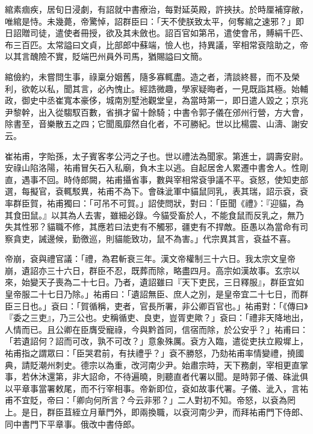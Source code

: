 \begin{pinyinscope}
 綰素痼疾，居旬日浸劇，有詔就中書療治，每對延英殿，許挾扶。於時厘補穿敝，唯綰是恃。未幾薨，帝驚悼，詔群臣曰：「天不使朕致太平，何奪綰之速邪？」即日詔贈司徒，遣使者冊授，欲及其未斂也。詔百官如第吊，遣使會吊，賻絹千匹、布三百匹。太常謚曰文貞，比部郎中蘇端，憸人也，持異議，宰相常袞陰助之，帝以其言醜險不實，貶端巴州員外司馬，猶賜謚曰文簡。



 綰儉約，未嘗問生事，祿稟分姻舊，隨多寡輒盡。造之者，清談終晷，而不及榮利，欲乾以私，聞其言，必內愧止。經誥微趣，學家疑晦者，一見既詣其極。始輔政，御史中丞崔寬本豪侈，城南別墅池觀堂皇，為當時第一，即日遣人毀之；京兆尹黎幹，出入從騶馭百數，省損才留十餘騎；中書令郭子儀在邠州行營，方大會，除書至，音樂散五之四；它聞風靡然自化者，不可勝紀。世以比楊震、山濤、謝安云。



 崔祐甫，字貽孫，太子賓客孝公沔之子也。世以禮法為聞家。第進士，調壽安尉。安祿山陷洛陽，祐甫冒矢石入私廟，負木主以逃。自起居舍人累遷中書舍人。性剛直，遇事不回。時侍郎闕，祐甫攝省事，數與宰相常袞爭議不平。袞怒，使知吏部選，每擬官，袞輒駁異，祐甫不為下。會硃泚軍中貓鼠同乳，表其瑞，詔示袞，袞率群臣賀，祐甫獨曰：「可吊不可賀。」詔使問狀，對曰：「臣聞《禮》：『迎貓，為其食田鼠。』以其為人去害，雖細必錄。今貓受畜於人，不能食鼠而反乳之，無乃失其性邪？貓職不修，其應若曰法吏有不觸邪，疆吏有不捍敵。臣愚以為當命有司察貪吏，誡邊候，勤徼巡，則貓能致功，鼠不為害。」代宗異其言，袞益不喜。



 帝崩，袞與禮官議：「禮，為君斬衰三年。漢文帝權制三十六日。我太宗文皇帝崩，遺詔亦三十六日，群臣不忍，既葬而除，略盡四月。高宗如漢故事。玄宗以來，始變天子喪為二十七日。乃者，遺詔雖曰『天下吏民，三日釋服』，群臣宜如皇帝服二十七日乃除。」祐甫曰：「遺詔無臣、庶人之別，是皇帝宜二十七日，而群臣三日也。」袞曰：「賀循稱，吏者，官長所署，非公卿百官也。」祐甫對：「《傳曰》『委之三吏』，乃三公也。史稱循吏、良吏，豈胥吏歟？」袞曰：「禮非天降地出，人情而已。且公卿在臣膺受寵祿，今與黔首同，信宿而除，於公安乎？」祐甫曰：「若遺詔何？詔而可改，孰不可改？」意象殊厲。袞方入臨，遣從吏扶立殿墀上，祐甫指之謂眾曰：「臣哭君前，有扶禮乎？」袞不勝怒，乃劾祐甫率情變禮，撓國典，請貶潮州刺史。德宗以為重，改河南少尹。始肅宗時，天下務劇，宰相更直掌事，若休沐還第，非大詔命，不待遍曉，則聽直者代署以聞。是時郭子儀、硃泚俱以平章事當署敕尾，而不行宰相事。帝新即位，袞如故事代署。子儀、泚入，言祐甫不宜貶，帝曰：「卿向何所言？今云非邪？」二人對初不知。帝怒，以袞為罔上。是日，群臣苴絰立月華門外，即兩換職，以袞河南少尹，而拜祐甫門下侍郎、同中書門下平章事。俄改中書侍郎。




\end{pinyinscope}

